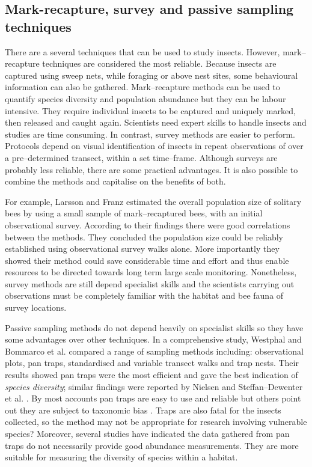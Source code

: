 \subsection{Mark-recapture, survey and passive sampling techniques}\label{sec:mark-recapture,-survey-and-passive-sampling-techniques} 
There are a several techniques that can be used to study insects. However, mark--recapture techniques are considered the most reliable. Because insects are captured using sweep nets, while foraging or above nest sites, some behavioural information can also be gathered. Mark--recapture methods can be used to quantify species diversity and population abundance but they can be labour intensive. They require individual insects to be captured and uniquely marked, then released and caught again. Scientists need expert skills to handle insects and studies are time consuming. In contrast, survey methods are easier to perform. Protocols depend on visual identification of insects in repeat observations of over a pre--determined transect, within a set time--frame. Although surveys are probably less reliable, there are some practical advantages. It is also possible to combine the methods and capitalise on the benefits of both. 

For example, Larsson and Franz \cite{Larson2008} estimated the overall population size of solitary bees by using a small sample of mark--recaptured bees, with an initial observational survey. According to their findings there were good correlations between the methods. They concluded the population size could be reliably established using observational survey walks alone. More importantly they showed their method could save considerable time and effort and thus enable resources to be directed towards long term large scale monitoring. Nonetheless, survey methods are still depend specialist skills and the scientists carrying out observations must be completely familiar with the habitat and bee fauna of survey locations.

Passive sampling methods do not depend heavily on specialist skills so they have some advantages over other techniques. In a comprehensive study, Westphal and Bommarco et al. \cite{Westphal2008} compared a range of sampling methods including: observational plots, pan traps, standardised and variable transect walks and trap nests. Their results showed pan traps were the most efficient and gave the best indication of \emph{species diversity}; similar findings were reported by Nielsen and Steffan--Dewenter et al. \cite{Nielsen2011}. By most accounts pan traps are easy to use and reliable \cite{Westphal2008,Nielsen2011} but others point out they are subject to taxonomic bias \cite{Cane2000,Roulston2007,Tuell2009}. Traps are also fatal for the insects collected, so the method may not be appropriate for research involving vulnerable species? Moreover, several studies have indicated \cite{Cane2000, Wilson2008,Tuell2009} the data gathered from pan traps do not necessarily provide good abundance measurements. They are more suitable for measuring the diversity of species within a habitat.

